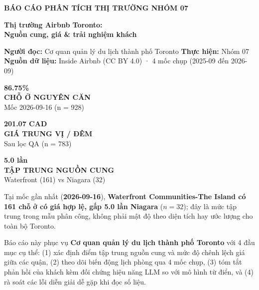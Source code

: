 \documentclass[11pt,a4paper]{article}
\newcommand{\kpicard}[3]{%
  \begin{tcolorbox}[
    colback=LightBg, colframe=BorderGray, boxrule=0.6pt, arc=3pt,
    left=6pt, right=6pt, top=8pt, bottom=8pt, halign=center
  ]
    {\LARGE\bfseries\color{NavyDark} #1}\\[3pt]
    {\footnotesize\bfseries\color{TealAccent} #2}\\[2pt]
    {\scriptsize\color{MutedGray} #3}
  \end{tcolorbox}%
}
\begin{document}
\thispagestyle{empty}

\begin{tcolorbox}[
  colback=NavyDark, colframe=NavyDark, arc=4pt,
  left=16pt, right=16pt, top=16pt, bottom=16pt
]
  {\footnotesize\color{BorderGray}\textbf{BÁO CÁO PHÂN TÍCH THỊ TRƯỜNG \textbar{} NHÓM 07}}\\[6pt]
  {\raggedright\Huge\bfseries\color{white} Thị trường Airbnb Toronto:\\[2pt] Nguồn cung, giá \& trải nghiệm khách\par}\vspace{10pt}
  {\small\color{BorderGray}
    \textbf{Người đọc:} Cơ quan quản lý du lịch thành phố Toronto \quad\textbar\quad
    \textbf{Thực hiện:} Nhóm 07\\
    \textbf{Nguồn dữ liệu:} Inside Airbnb (CC BY 4.0) · 4 mốc chụp (2025-09 đến 2026-09)
  }
\end{tcolorbox}

\vspace{4pt}

\noindent
\begin{minipage}[t]{0.32\textwidth}
  \kpicard{86.75\%}{CHỖ Ở NGUYÊN CĂN}{Mốc 2026-09-16 (n = 928)}
\end{minipage}\hfill
\begin{minipage}[t]{0.32\textwidth}
  \kpicard{201.07 CAD}{GIÁ TRUNG VỊ / ĐÊM}{Sau lọc QA (n = 783)}
\end{minipage}\hfill
\begin{minipage}[t]{0.32\textwidth}
  \kpicard{5.0 lần}{TẬP TRUNG NGUỒN CUNG}{Waterfront (161) vs Niagara (32)}
\end{minipage}

\vspace{6pt}

\begin{storybox}[Ý chính]
Tại mốc gần nhất (\textbf{2026-09-16}), \textbf{Waterfront Communities-The Island có 161 chỗ ở có giá hợp lệ, gấp 5.0 lần Niagara} ($n = 32$); đây là mức tập trung trong mẫu phân công, không phải mật độ theo diện tích hay ước lượng cho toàn bộ Toronto.

\medskip
Báo cáo này phục vụ \textbf{Cơ quan quản lý du lịch thành phố Toronto} với 4 đầu mục cụ thể: (1) xác định điểm tập trung nguồn cung và mức độ chênh lệch giá giữa các quận, (2) theo dõi biến động lịch phòng qua 4 mốc chụp, (3) tóm tắt phản hồi của khách kèm đối chứng hiệu năng LLM so với mô hình từ điển, và (4) rà soát các lỗi diễn giải dễ gặp khi đọc số liệu.
\end{storybox}
\end{document}
